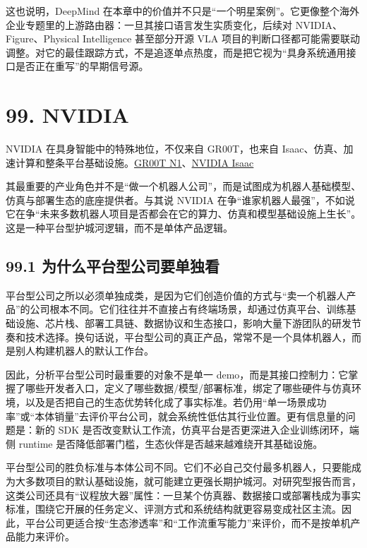 这也说明，DeepMind 在本章中的价值并不只是“一个明星案例”。它更像整个海外企业专题里的上游路由器：一旦其接口语言发生实质变化，后续对 NVIDIA、Figure、Physical Intelligence 甚至部分开源 VLA 项目的判断口径都可能需要联动调整。对它的最佳跟踪方式，不是追逐单点热度，而是把它视为“具身系统通用接口是否正在重写”的早期信号源。

\chapter*{99. NVIDIA}

NVIDIA 在具身智能中的特殊地位，不仅来自 GR00T，也来自 Isaac、仿真、加速计算和整条平台基础设施。\href{https://arxiv.org/abs/2503.14734}{GR00T N1}、\href{https://developer.nvidia.com/isaac}{NVIDIA Isaac}

其最重要的产业角色并不是“做一个机器人公司”，而是试图成为机器人基础模型、仿真与部署生态的底座提供者。与其说 NVIDIA 在争“谁家机器人最强”，不如说它在争“未来多数机器人项目是否都会在它的算力、仿真和模型基础设施上生长”。这是一种平台型护城河逻辑，而不是单体产品逻辑。

\section*{99.1 为什么平台型公司要单独看}


平台型公司之所以必须单独成类，是因为它们创造价值的方式与“卖一个机器人产品”的公司根本不同。它们往往并不直接占有终端场景，却通过仿真平台、训练基础设施、芯片栈、部署工具链、数据协议和生态接口，影响大量下游团队的研发节奏和技术选择。换句话说，平台型公司的真正产品，常常不是一个具体机器人，而是别人构建机器人的默认工作台。

因此，分析平台型公司时最重要的对象不是单一 demo，而是其接口控制力：它掌握了哪些开发者入口，定义了哪些数据/模型/部署标准，绑定了哪些硬件与仿真环境，以及是否把自己的生态优势转化成了事实标准。若仍用“单一场景成功率”或“本体销量”去评价平台公司，就会系统性低估其行业位置。更有信息量的问题是：新的 SDK 是否改变默认工作流，仿真平台是否更深进入企业训练闭环，端侧 runtime 是否降低部署门槛，生态伙伴是否越来越难绕开其基础设施。

平台型公司的胜负标准与本体公司不同。它们不必自己交付最多机器人，只要能成为大多数项目的默认基础设施，就可能建立更强长期护城河。对研究型报告而言，这类公司还具有“议程放大器”属性：一旦某个仿真器、数据接口或部署栈成为事实标准，围绕它开展的任务定义、评测方式和系统结构就更容易变成社区主流。因此，平台公司更适合按“生态渗透率”和“工作流重写能力”来评价，而不是按单机产品能力来评价。

